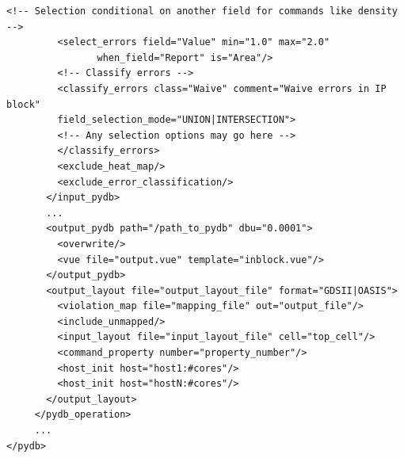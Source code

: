 \begin{lstlisting}[style=shell,caption={XML 命令文件语法},label={ex:xml-cmd-syntax}]
         <!-- Selection conditional on another field for commands like density -->
         <select_errors field="Value" min="1.0" max="2.0"
                when_field="Report" is="Area"/>
         <!-- Classify errors -->
         <classify_errors class="Waive" comment="Waive errors in IP block"
         field_selection_mode="UNION|INTERSECTION">
         <!-- Any selection options may go here -->
         </classify_errors>
         <exclude_heat_map/>
         <exclude_error_classification/>
       </input_pydb>
       ...
       <output_pydb path="/path_to_pydb" dbu="0.0001">
         <overwrite/>
         <vue file="output.vue" template="inblock.vue"/>
       </output_pydb>
       <output_layout file="output_layout_file" format="GDSII|OASIS">
         <violation_map file="mapping_file" out="output_file"/>
         <include_unmapped/>
         <input_layout file="input_layout_file" cell="top_cell"/>
         <command_property number="property_number"/>
         <host_init host="host1:#cores"/>
         <host_init host="hostN:#cores"/>
       </output_layout>
     </pydb_operation>
     ...
</pydb>
\end{lstlisting}

